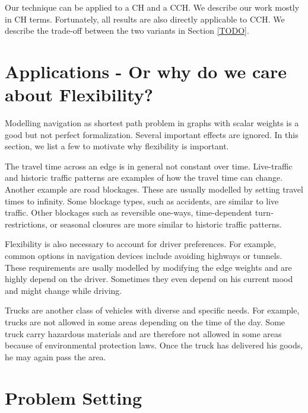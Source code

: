 \documentclass[a4paper,UKenglish,cleveref, autoref]{lipics-v2019}
\begin{document}
Our technique can be applied to a CH and a CCH.
We describe our work mostly in CH terms.
Fortunately, all results are also directly applicable to CCH.
We describe the trade-off between the two variants in Section \ref{TODO}.

\section{Applications - Or why do we care about Flexibility?}

Modelling navigation as shortest path problem in graphs with scalar weights is a good but not perfect formalization.
Several important effects are ignored.
In this section, we list a few to motivate why flexibility is important.

The travel time across an edge is in general not constant over time.
Live-traffic and historic traffic patterns are examples of how the travel time can change.
Another example are road blockages.
These are usually modelled by setting travel times to infinity.
Some blockage types, such as accidents, are similar to live traffic.
Other blockages such as reversible one-ways, time-dependent turn-restrictions, or seasonal closures are more similar to historic traffic patterns.

Flexibility is also necessary to account for driver preferences.
For example, common options in navigation devices include avoiding highways or tunnels.
These requirements are usally modelled by modifying the edge weights and are highly depend on the driver.
Sometimes they even depend on his current mood and might change while driving.

Trucks are another class of vehicles with diverse and specific needs.
For example, trucks are not allowed in some areas depending on the time of the day.
Some truck carry hazardous materials and are therefore not allowed in some areas because of environmental protection laws.
Once the truck has delivered his goods, he may again pass the area.

\section{Problem Setting}
\end{document}
